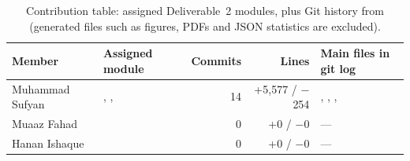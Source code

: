 \begin{table}[H]
\centering\small
\begin{tabularx}{\linewidth}{@{}l L r r L@{}}
\toprule
Member & Assigned module & Commits & Lines & Main files in git log\\
\midrule
Muhammad Sufyan & , ,  & 14 & +5,577 / $-$254 & , , , \\
Muaaz Fahad &  & 0 & +0 / $-$0 & ---\\
Hanan Ishaque &  & 0 & +0 / $-$0 & ---\\
\bottomrule
\end{tabularx}
\caption{Contribution table: assigned Deliverable~2 modules, plus Git history from  (generated files such as figures, PDFs and JSON statistics are excluded).}\label{tab:contrib}
\end{table}
